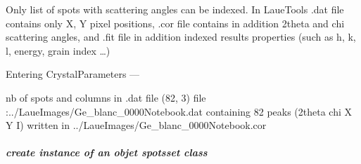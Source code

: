 \documentclass[letterpaper,10pt,english]{sphinxmanual}
\begin{document}

Only list of spots with scattering angles can be indexed. In LaueTools
.dat file contains only X, Y pixel positions, .cor file contains in
addition 2theta and chi scattering angles, and .fit file in addition
indexed results properties (such as h, k, l, energy, grain index …)

%
\begin{sphinxVerbatim}[commandchars=\\\{\}]
   
  \PYG{p}{[}\PYG{p}{]}  
  
\end{sphinxVerbatim}
\begin{sphinxalltt}
Entering CrystalParameters \sphinxstylestrong{**}---\sphinxstylestrong{***********************}


nb of spots and columns in .dat file (82, 3)
file :../LaueImages/Ge\_blanc\_0000Notebook.dat
containing 82 peaks
(2theta chi X Y I) written in ../LaueImages/Ge\_blanc\_0000Notebook.cor
\end{sphinxalltt}


\subparagraph{create instance of an objet spotsset class}
\label{\detokenize{Basic_PeakSearch_IndexRefine:create-instance-of-an-objet-spotsset-class}}
%
\begin{sphinxVerbatim}[commandchars=\\\{\}]
   
  

\end{sphinxVerbatim}
\end{document}
